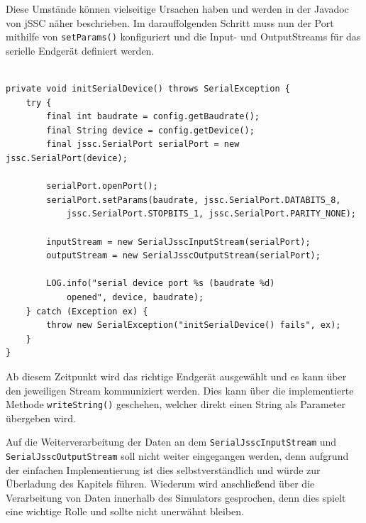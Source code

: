 Diese Umstände können vielseitige Ursachen haben und werden in der Javadoc von jSSC näher beschrieben.
Im darauffolgenden Schritt muss nun der Port mithilfe von \lstinline[style=java]{setParams()} konfiguriert und die Input- und OutputStreams für das serielle Endgerät definiert werden.\\\\
%
\begin{lstlisting}[style=java,caption=Methode initSimulation(),label=fdsafdsafds]
private void initSerialDevice() throws SerialException {
    try {
        final int baudrate = config.getBaudrate();
        final String device = config.getDevice();
        final jssc.SerialPort serialPort = new jssc.SerialPort(device);

        serialPort.openPort();
        serialPort.setParams(baudrate, jssc.SerialPort.DATABITS_8,
            jssc.SerialPort.STOPBITS_1, jssc.SerialPort.PARITY_NONE);

        inputStream = new SerialJsscInputStream(serialPort);
        outputStream = new SerialJsscOutputStream(serialPort);

        LOG.info("serial device port %s (baudrate %d)
            opened", device, baudrate);
    } catch (Exception ex) {
        throw new SerialException("initSerialDevice() fails", ex);
    }
}
\end{lstlisting}
Ab diesem Zeitpunkt wird das richtige Endgerät ausgewählt und es kann über den jeweiligen Stream kommuniziert werden.
Dies kann über die implementierte Methode \lstinline[style=java]{writeString()} geschehen, welcher direkt einen String als Parameter übergeben wird.

Auf die Weiterverarbeitung der Daten an dem \lstinline[style=java]{SerialJsscInputStream} und \lstinline[style=java]{SerialJsscOutputStream} soll nicht weiter eingegangen werden, denn aufgrund der einfachen Implementierung ist dies selbstverständlich und würde zur Überladung des Kapitels führen.
Wiederum wird anschließend über die Verarbeitung von Daten innerhalb des Simulators gesprochen, denn dies spielt eine wichtige Rolle und sollte nicht unerwähnt bleiben.
